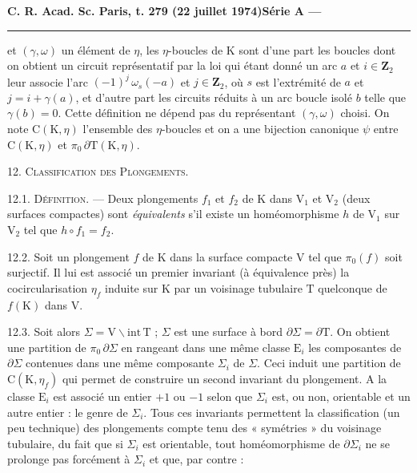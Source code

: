 \textbf{C. R. Acad. Sc. Paris, t. 279 (22 juillet 1974)}\hfill\textbf{Série A ---}\par\noindent\rule{\linewidth}{.35pt}\par

et \((\gamma,\omega)\) un élément de \(\eta\), les \(\eta\)-boucles de \(\mathrm{K}\) sont d'une part les boucles dont on obtient un circuit représentatif par la loi qui étant donné un arc \(a\) et \(i\in\mathbf{Z}_2\) leur associe l'arc \((-1)^j\,\omega_s(-a)\) et \(j\in\mathbf{Z}_2\), où \(s\) est l'extrémité de \(a\) et \(j=i+\gamma(a)\), et d'autre part les circuits réduits à un arc boucle isolé \(b\) telle que \(\gamma(b)=0\). Cette définition ne dépend pas du représentant \((\gamma,\omega)\) choisi. On note \(\mathrm{C}(\mathrm{K},\eta)\) l'ensemble des \(\eta\)-boucles et on a une bijection canonique \(\psi\) entre \(\mathrm{C}(\mathrm{K},\eta)\) et \(\pi_0\,\partial\mathrm{T}(\mathrm{K},\eta)\).

12. \textsc{Classification des Plongements.}

12.1. \textsc{Définition.} --- Deux plongements \(f_1\) et \(f_2\) de \(\mathrm{K}\) dans \(\mathrm{V}_1\) et \(\mathrm{V}_2\) (deux surfaces compactes) sont \textit{équivalents} s'il existe un homéomorphisme \(h\) de \(\mathrm{V}_1\) sur \(\mathrm{V}_2\) tel que \(h\circ f_1=f_2\).

12.2. Soit un plongement \(f\) de \(\mathrm{K}\) dans la surface compacte \(\mathrm{V}\) tel que \(\pi_0(f)\) soit surjectif. Il lui est associé un premier invariant (à équivalence près) la cocircularisation \(\eta_f\) induite sur \(\mathrm{K}\) par un voisinage tubulaire \(\mathrm{T}\) quelconque de \(f(\mathrm{K})\) dans \(\mathrm{V}\).

12.3. Soit alors \(\Sigma=\mathrm{V}\backslash\mathrm{int}\,\mathrm{T}\) ; \(\Sigma\) est une surface à bord \(\partial\Sigma=\partial\mathrm{T}\). On obtient une partition de \(\pi_0\,\partial\Sigma\) en rangeant dans une même classe \(\mathrm{E}_i\) les composantes de \(\partial\Sigma\) contenues dans une même composante \(\Sigma_i\) de \(\Sigma\). Ceci induit une partition de \(\mathrm{C}(\mathrm{K},\eta_f)\) qui permet de construire un second invariant du plongement. A la classe \(\mathrm{E}_i\) est associé un entier \(+1\) ou \(-1\) selon que \(\Sigma_i\) est, ou non, orientable et un autre entier : le genre de \(\Sigma_i\). Tous ces invariants permettent la classification (un peu technique) des plongements compte tenu des « symétries » du voisinage tubulaire, du fait que si \(\Sigma_i\) est orientable, tout homéomorphisme de \(\partial\Sigma_i\) ne se prolonge pas forcément à \(\Sigma_i\) et que, par contre :

